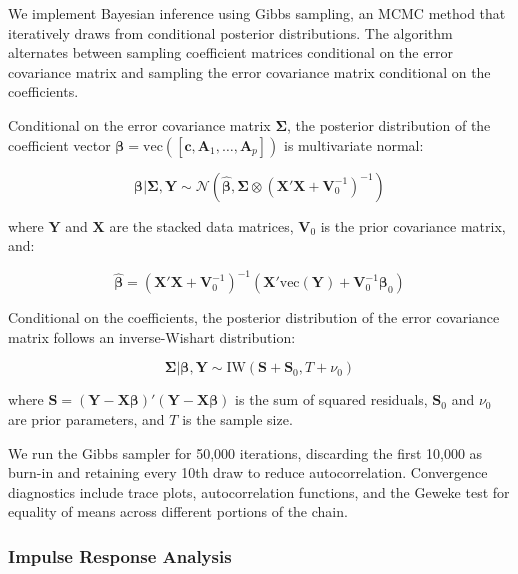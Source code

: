 We implement Bayesian inference using Gibbs sampling, an MCMC method that iteratively draws from conditional posterior distributions. The algorithm alternates between sampling coefficient matrices conditional on the error covariance matrix and sampling the error covariance matrix conditional on the coefficients.

Conditional on the error covariance matrix $\mathbf{\Sigma}$, the posterior distribution of the coefficient vector $\boldsymbol{\beta} = \text{vec}([\mathbf{c}, \mathbf{A}_1, \ldots, \mathbf{A}_p])$ is multivariate normal:

\begin{equation} \label{eq:coefficient_posterior}
\boldsymbol{\beta} | \mathbf{\Sigma}, \mathbf{Y} \sim \mathcal{N}(\hat{\boldsymbol{\beta}}, \mathbf{\Sigma} \otimes (\mathbf{X}'\mathbf{X} + \mathbf{V}_0^{-1})^{-1})
\end{equation}

where $\mathbf{Y}$ and $\mathbf{X}$ are the stacked data matrices, $\mathbf{V}_0$ is the prior covariance matrix, and:

\begin{equation} \label{eq:coefficient_mean}
\hat{\boldsymbol{\beta}} = (\mathbf{X}'\mathbf{X} + \mathbf{V}_0^{-1})^{-1}(\mathbf{X}'\text{vec}(\mathbf{Y}) + \mathbf{V}_0^{-1}\boldsymbol{\beta}_0)
\end{equation}

Conditional on the coefficients, the posterior distribution of the error covariance matrix follows an inverse-Wishart distribution:

\begin{equation} \label{eq:covariance_posterior}
\mathbf{\Sigma} | \boldsymbol{\beta}, \mathbf{Y} \sim \text{IW}(\mathbf{S} + \mathbf{S}_0, T + \nu_0)
\end{equation}

where $\mathbf{S} = (\mathbf{Y} - \mathbf{X}\boldsymbol{\beta})'(\mathbf{Y} - \mathbf{X}\boldsymbol{\beta})$ is the sum of squared residuals, $\mathbf{S}_0$ and $\nu_0$ are prior parameters, and $T$ is the sample size.

We run the Gibbs sampler for 50,000 iterations, discarding the first 10,000 as burn-in and retaining every 10th draw to reduce autocorrelation. Convergence diagnostics include trace plots, autocorrelation functions, and the Geweke test for equality of means across different portions of the chain.

\subsubsection{Impulse Response Analysis}

